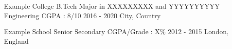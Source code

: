 

\begin{cveducation}

  \cvschool
    {Example College } %
    {B.Tech Major in XXXXXXXXX and YYYYYYYYYY Engineering} %
    {CGPA : 8/10} %
    {2016 - 2020} %
    {City, Country} %

  \cvschool
    {Example School} %
    {Senior Secondary} %
    {CGPA/Grade : X\%} %
    {2012 - 2015} %
    {London, England} %
    
\end{cveducation}
